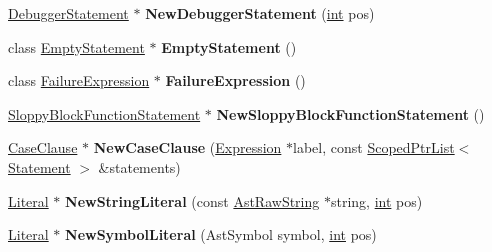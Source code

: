 \begin{DoxyCompactItemize}
\mbox{\hyperlink{classv8_1_1internal_1_1DebuggerStatement}{Debugger\+Statement}} $\ast$ {\bfseries New\+Debugger\+Statement} (\mbox{\hyperlink{classint}{int}} pos)
\item 
\mbox{\label{classv8_1_1internal_1_1AstNodeFactory_af6dcab3fdfef4d840eb37c192730b9bb}} 
class \mbox{\hyperlink{classv8_1_1internal_1_1EmptyStatement}{Empty\+Statement}} $\ast$ {\bfseries Empty\+Statement} ()
\item 
\mbox{\label{classv8_1_1internal_1_1AstNodeFactory_a64fde75c23f11cf30c39d3d2b7912b94}} 
class \mbox{\hyperlink{classv8_1_1internal_1_1FailureExpression}{Failure\+Expression}} $\ast$ {\bfseries Failure\+Expression} ()
\item 
\mbox{\label{classv8_1_1internal_1_1AstNodeFactory_a532641d46057c3e30ceff5d67702e520}} 
\mbox{\hyperlink{classv8_1_1internal_1_1SloppyBlockFunctionStatement}{Sloppy\+Block\+Function\+Statement}} $\ast$ {\bfseries New\+Sloppy\+Block\+Function\+Statement} ()
\item 
\mbox{\label{classv8_1_1internal_1_1AstNodeFactory_aadda9d5d8ceecd33a729305711a408a5}} 
\mbox{\hyperlink{classv8_1_1internal_1_1CaseClause}{Case\+Clause}} $\ast$ {\bfseries New\+Case\+Clause} (\mbox{\hyperlink{classv8_1_1internal_1_1Expression}{Expression}} $\ast$label, const \mbox{\hyperlink{classv8_1_1internal_1_1ScopedPtrList}{Scoped\+Ptr\+List}}$<$ \mbox{\hyperlink{classv8_1_1internal_1_1Statement}{Statement}} $>$ \&statements)
\item 
\mbox{\label{classv8_1_1internal_1_1AstNodeFactory_a26846ca98d4db7ec0aeb2eb2bc46cb8e}} 
\mbox{\hyperlink{classv8_1_1internal_1_1Literal}{Literal}} $\ast$ {\bfseries New\+String\+Literal} (const \mbox{\hyperlink{classv8_1_1internal_1_1AstRawString}{Ast\+Raw\+String}} $\ast$string, \mbox{\hyperlink{classint}{int}} pos)
\item 
\mbox{\label{classv8_1_1internal_1_1AstNodeFactory_a488395e83125db6e7df017a30bd3add4}} 
\mbox{\hyperlink{classv8_1_1internal_1_1Literal}{Literal}} $\ast$ {\bfseries New\+Symbol\+Literal} (Ast\+Symbol symbol, \mbox{\hyperlink{classint}{int}} pos)

\end{DoxyCompactItemize}
